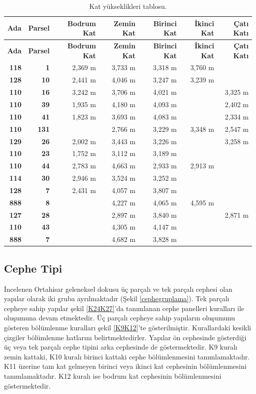 \documentclass[12pt,turkish,a4paperpaper,]{report}
\begin{document}
\begin{longtable}[]{@{}rrrrrrr@{}}
\caption{Kat yükseklikleri tablosu.
\label{katyukseklikleri}}\tabularnewline
\toprule
\textbf{Ada} & \textbf{Parsel} & \textbf{Bodrum Kat} & \textbf{Zemin
Kat} & \textbf{Birinci Kat} & \textbf{İkinci Kat} & \textbf{Çatı
Katı}\tabularnewline
\midrule
\endfirsthead
\toprule
\textbf{Ada} & \textbf{Parsel} & \textbf{Bodrum Kat} & \textbf{Zemin
Kat} & \textbf{Birinci Kat} & \textbf{İkinci Kat} & \textbf{Çatı
Katı}\tabularnewline
\midrule
\endhead
\textbf{118} & \textbf{1} & 2,369 m & 3,733 m & 3,318 m & 3,760 m
&\tabularnewline
\textbf{128} & \textbf{10} & 2,441 m & 4,046 m & 3,247 m & 3,239 m
&\tabularnewline
\textbf{110} & \textbf{16} & 3,242 m & 3,706 m & 4,021 m & & 3,325
m\tabularnewline
\textbf{110} & \textbf{39} & 1,935 m & 4,180 m & 4,093 m & & 2,402
m\tabularnewline
\textbf{110} & \textbf{41} & 1,823 m & 3,693 m & 4,083 m & & 2,334
m\tabularnewline
\textbf{110} & \textbf{131} & & 2,766 m & 3,229 m & 3,348 m & 2,547
m\tabularnewline
\textbf{129} & \textbf{26} & 2,002 m & 3,443 m & 3,226 m & & 3,258
m\tabularnewline
\textbf{110} & \textbf{23} & 1,752 m & 3,112 m & 3,189 m &
&\tabularnewline
\textbf{110} & \textbf{44} & 2,783 m & 4,663 m & 2,933 m & 2,913 m
&\tabularnewline
\textbf{114} & \textbf{30} & 2,946 m & 3,524 m & 3,252 m &
&\tabularnewline
\textbf{128} & \textbf{7} & 2,431 m & 4,057 m & 3,807 m &
&\tabularnewline
\textbf{888} & \textbf{8} & & 4,227 m & 4,065 m & 4,595 m
&\tabularnewline
\textbf{127} & \textbf{28} & & 2,897 m & 3,840 m & & 2,871
m\tabularnewline
\textbf{110} & \textbf{43} & & 4,305 m & 4,147 m & &\tabularnewline
\textbf{888} & \textbf{7} & & 4,682 m & 3,828 m & &\tabularnewline
\bottomrule
\end{longtable}

\hypertarget{cephe-tipi}{%
\subsection{Cephe Tipi}\label{cephe-tipi}}

İncelenen Ortahisar geleneksel dokusu üç parçalı ve tek parçalı cephesi
olan yapılar olarak iki gruba ayrılmaktadır (Şekil \ref{cephegruplama}).
Tek parçalı cepheye sahip yapılar şekil \ref{K24K27}'da tanımlanan cephe
panelleri kuralları ile oluşumuna devam etmektedir. Üç parçalı cepheye
sahip yapıların oluşumunu gösteren bölümlenme kuralları şekil
\ref{K9K12}'te gösterilmiştir. Kurallardaki kesikli çizgiler bölümlenme
hatlarını belirtmektedirler. Yapılar ön cephesinde gösterdiği üç veya
tek parçalı cephe tipini arka cephesinde de göstermektedir. K9 kuralı
zemin kattaki, K10 kuralı birinci kattaki cephe bölümlenmesini
tanımlamaktadır. K11 üzerine tam kat gelmeyen birinci veya ikinci kat
cephesinin bölümlenmesini tanımlamaktadır. K12 kuralı ise bodrum kat
cephesinin bölümlenmesini göstermektedir.
\end{document}
